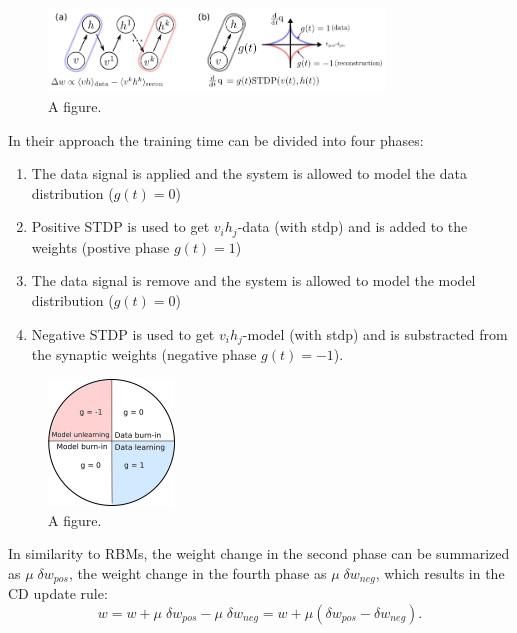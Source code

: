 \begin{figure}
	\centering
    	\includegraphics[width=0.8\textwidth]{imgs/eCD2.png} 
    \caption{A figure.}
	\label{fig:test}
\end{figure}
  
In their approach the training time can be divided into four phases:
\begin{enumerate}
\item The data signal is applied and the system is allowed to model the data distribution ($g(t)=0$)
\item Positive STDP is used to get $v_i h_j$-data (with stdp) and is added to the weights (postive phase $g(t)=1$)
\item The data signal is remove and the system is allowed to model the model distribution ($g(t)=0$)
\item Negative STDP is used to get $v_i h_j$-model (with stdp) and is substracted from the synaptic weights (negative phase $g(t)=-1$).
\end{enumerate}


\begin{figure}
	\centering
    	\includegraphics[width=0.3\textwidth]{imgs/eCD11.png} 
    \caption{A figure.}
	\label{fig:test}
\end{figure}

In similarity to RBMs, the weight change in the second phase can be summarized as $\mu \; \delta w_{pos}$, the weight change in the fourth phase as $\mu \; \delta w_{neg}$, which results in the CD update rule:
\[
w = w +  \mu \; \delta w_{pos} - \mu \; \delta w_{neg} = w +  \mu (\delta w_{pos} - \delta w_{neg}).
\]
 